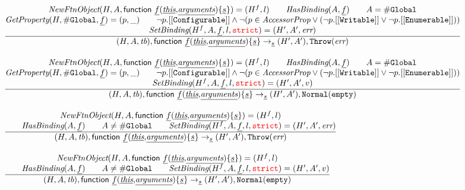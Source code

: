 \[\begin{array}{l@{~~}l@{~~}ll}
\frac{\begin{matrix}
\hf{NewFtnObject}(H,A,\irfndecl) = (H^f, l)
\rulesep
\hf{HasBinding}(A, \ir{f})
\rulesep A = \lg\\
\hf{GetProperty}(H,\lg,\ir{f}) = (p, \_)
\rulesep
\neg p.{\tt[[Configurable]]}
\wedge \neg (p \in \emph{AccessorProp} \vee (\neg p.{\tt[[Writable]]} \vee \neg p.{\tt[[Enumerable]]}))
\\
\hf{SetBinding}(H^f, A, \ir{f}, l, \strict) = (H', A', \err)
\end{matrix}}{\begin{matrix}
\state, \irfndecl \rightarrow_{\ir\stmt}\resp, \error
\end{matrix}}\\[2em]

\frac{\begin{matrix}
\hf{NewFtnObject}(H,A,\irfndecl) = (H^f, l)
\rulesep
\hf{HasBinding}(A, \ir{f})
\rulesep A = \lg\\
\hf{GetProperty}(H,\lg,\ir{f}) = (p, \_)
\rulesep
\neg p.{\tt[[Configurable]]}
\wedge \neg (p \in \emph{AccessorProp} \vee (\neg p.{\tt[[Writable]]} \vee \neg p.{\tt[[Enumerable]]}))
\\
\hf{SetBinding}(H^f, A, \ir{f}, l, \strict) = (H', A', v)
\end{matrix}}{\begin{matrix}
\state, \irfndecl \rightarrow_{\ir\stmt}\resp, \void
\end{matrix}}\\[2em]

\frac{\begin{matrix}
\hf{NewFtnObject}(H,A,\irfndecl) = (H^f, l)\\
\rulesep
\hf{HasBinding}(A, \ir{f})
\rulesep
A \not= \lg
\rulesep
\hf{SetBinding}(H^f, A, \ir{f}, l, \strict) = (H', A', \err)
\end{matrix}}{\begin{matrix}
\state, \irfndecl \rightarrow_{\ir\stmt}
\resp, \error
\end{matrix}}\\[2em]
\frac{\begin{matrix}
\hf{NewFtnObject}(H,A,\irfndecl) = (H^f, l)\\
\rulesep
\hf{HasBinding}(A, \ir{f})
\rulesep
A \not= \lg
\rulesep
\hf{SetBinding}(H^f, A, \ir{f}, l, \strict) = (H', A', v)
\end{matrix}}{\begin{matrix}
\state, \irfndecl \rightarrow_{\ir\stmt} \resp, \void
\end{matrix}}\\[2em]



\end{array}\]
